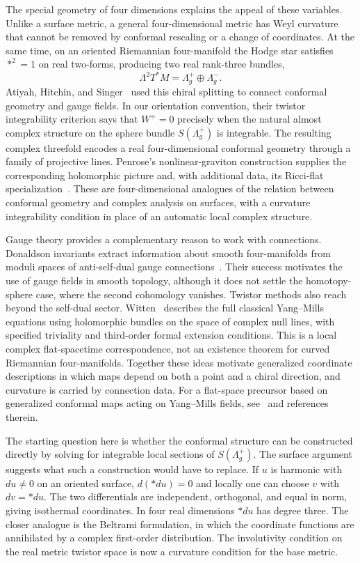 \documentclass[11pt]{article}
\numberwithin{equation}{section}
\begin{document}
The special geometry of four dimensions explains the appeal of these
variables. Unlike a surface metric, a general four-dimensional metric has
Weyl curvature that cannot be removed by conformal rescaling or a change
of coordinates. At the same time, on an oriented Riemannian four-manifold
the Hodge star satisfies \(*^2=1\) on real two-forms, producing two real
rank-three bundles,
\[
 \Lambda^2T^*M=\Lambda_g^+\oplus\Lambda_g^-.
\]
Atiyah, Hitchin, and Singer~\cite{AHS1978} used this chiral splitting to
connect conformal geometry and gauge fields. In our orientation convention,
their twistor integrability criterion says that \(W^+=0\) precisely when
the natural almost complex
structure on the sphere bundle \(S(\Lambda_g^+)\) is integrable.
The resulting complex threefold encodes a real four-dimensional conformal
geometry through a family of projective lines. Penrose's nonlinear-graviton
construction supplies the corresponding
holomorphic picture and, with additional data, its Ricci-flat
specialization~\cite{Penrose1976}. These are four-dimensional analogues of
the relation between conformal geometry and complex analysis on surfaces,
with a curvature integrability condition in place of an automatic local
complex structure.

Gauge theory provides a complementary reason to work with connections.
Donaldson invariants extract information about smooth four-manifolds from
moduli spaces of anti-self-dual gauge connections~\cite{DonaldsonKronheimer1990}.
Their success motivates the use of gauge fields in smooth topology,
although it does not settle the
homotopy-sphere case, where the second cohomology vanishes. Twistor methods
also reach beyond the self-dual sector. Witten~\cite{Witten1978} describes
the full classical Yang--Mills equations using holomorphic bundles on the
space of complex null lines, with specified triviality and third-order
formal extension conditions. This is a local
complex flat-spacetime correspondence, not an existence theorem for curved
Riemannian four-manifolds. Together these ideas motivate generalized
coordinate descriptions in which maps depend on both a point and a chiral
direction, and curvature is carried by connection data. For a flat-space
precursor based on generalized conformal maps acting on Yang--Mills fields,
see~\cite{Baker2023} and references therein.

The starting question here is whether the conformal structure can be
constructed directly by solving for integrable local sections of
\(S(\Lambda_g^+)\). The surface argument suggests what such a
construction would have to replace. If \(u\) is harmonic with
\(du\ne0\) on an oriented surface, \(d(*du)=0\) and locally one can
choose \(v\) with \(dv=*du\). The two differentials are independent,
orthogonal, and equal in norm, giving isothermal coordinates.
In four real dimensions \(*du\) has degree three. The closer analogue
is the Beltrami formulation, in which the coordinate functions are
annihilated by a complex first-order distribution. The involutivity
condition on the real metric twistor space is now a curvature
condition for the base metric.
\end{document}
